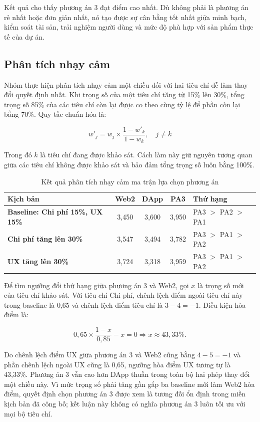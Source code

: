 Kết quả cho thấy phương án 3 đạt điểm cao nhất. Dù không phải là phương án rẻ nhất hoặc đơn giản nhất, nó tạo được sự cân bằng tốt nhất giữa minh bạch, kiểm soát tài sản, trải nghiệm người dùng và mức độ phù hợp với sản phẩm thực tế của dự án.

\subsection{Phân tích nhạy cảm}

Nhóm thực hiện phân tích nhạy cảm một chiều đối với hai tiêu chí dễ làm thay đổi quyết định nhất. Khi trọng số của một tiêu chí tăng từ 15\% lên 30\%, tổng trọng số 85\% của các tiêu chí còn lại được co theo cùng tỷ lệ để phần còn lại bằng 70\%. Quy tắc chuẩn hóa là:

\[
w'_j=w_j\times\frac{1-w'_k}{1-w_k},\quad j\ne k
\]

Trong đó $k$ là tiêu chí đang được khảo sát. Cách làm này giữ nguyên tương quan giữa các tiêu chí không được khảo sát và bảo đảm tổng trọng số luôn bằng 100\%.

\begin{table}[H]
\centering
\caption{Kết quả phân tích nhạy cảm ma trận lựa chọn phương án}
\label{tab:alternative-sensitivity}
\begin{tabularx}{\textwidth}{| >{\bfseries}p{4.2cm} | c | c | c | X |}
\hline
Kịch bản & Web2 & DApp & PA3 & Thứ hạng \\
\hline
Baseline: Chi phí 15\%, UX 15\% & 3,450 & 3,600 & 3,950 & PA3 $>$ PA2 $>$ PA1 \\ \hline
Chi phí tăng lên 30\% & 3,547 & 3,494 & 3,782 & PA3 $>$ PA1 $>$ PA2 \\ \hline
UX tăng lên 30\% & 3,724 & 3,318 & 3,959 & PA3 $>$ PA1 $>$ PA2 \\
\hline
\end{tabularx}
\end{table}

Để tìm ngưỡng đổi thứ hạng giữa phương án 3 và Web2, gọi $x$ là trọng số mới của tiêu chí khảo sát. Với tiêu chí Chi phí, chênh lệch điểm ngoài tiêu chí này trong baseline là 0,65 và chênh lệch điểm tiêu chí là $3-4=-1$. Điều kiện hòa điểm là:

\[
0{,}65\times\frac{1-x}{0{,}85}-x=0 \Rightarrow x\approx43{,}33\%.
\]

Do chênh lệch điểm UX giữa phương án 3 và Web2 cũng bằng $4-5=-1$ và phần chênh lệch ngoài UX cũng là 0,65, ngưỡng hòa điểm UX tương tự là 43,33\%. Phương án 3 vẫn cao hơn DApp thuần trong toàn bộ hai phép thay đổi một chiều này. Vì mức trọng số phải tăng gần gấp ba baseline mới làm Web2 hòa điểm, quyết định chọn phương án 3 được xem là tương đối ổn định trong miền kịch bản đã công bố; kết luận này không có nghĩa phương án 3 luôn tối ưu với mọi bộ tiêu chí.

